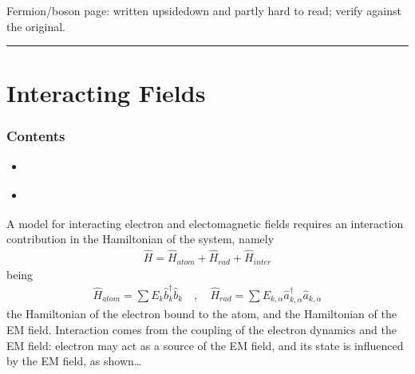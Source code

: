 \documentclass[letterpaper,10pt,english]{jupyterBook}
\begin{document}
\sphinxAtStartPar
\sphinxstylestrong{{[}check{]}} Fermion/boson page: written upside\sphinxhyphen{}down and partly hard to read; verify against the original.


\bigskip\hrule\bigskip


\sphinxstepscope


\section{Interacting Fields}
\label{\detokenize{ch/quantum-mechanics/qft/interactions:interacting-fields}}\label{\detokenize{ch/quantum-mechanics/qft/interactions:quantum-mechanics-qft-interactions}}\label{\detokenize{ch/quantum-mechanics/qft/interactions::doc}}\subsubsection*{Contents}
\begin{itemize}
\item {} 
\sphinxAtStartPar
{\hyperref[\detokenize{ch/quantum-mechanics/qft/interactions-perturbation:quantum-mechanics-qft-interactions-perturbation-theory}]{}}

\item {} 
\sphinxAtStartPar
{\hyperref[\detokenize{ch/quantum-mechanics/qft/interactions-e-em-fields:quantum-mechanics-qft-interactions-e-em-fields}]{}}

\end{itemize}

\sphinxAtStartPar
A model for interacting electron and electomagnetic fields requires an interaction contribution in the Hamiltonian of the system, namely
\begin{equation*}
\begin{split}
\hat H=\hat H_{atom}+\hat H_{rad}+\hat H_{inter}
\end{split}
\end{equation*}
\sphinxAtStartPar
being
\begin{equation*}
\begin{split}
\hat H_{atom}=\sum E_k\hat b_k^\dagger\hat b_k
\quad , \quad
\hat H_{rad}=\sum E_{k,\alpha}\hat a^\dagger_{k,\alpha}\hat a_{k,\alpha}
\end{split}
\end{equation*}
\sphinxAtStartPar
the Hamiltonian of the electron bound to the atom, and the Hamiltonian of the EM field. Interaction comes from the coupling of the electron dynamics and the EM field: electron may act as a source of the EM field, and its state is influenced by the EM field, as shown…
\end{document}
